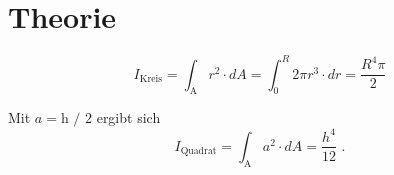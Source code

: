 \section{Theorie}
\label{sec:Theorie}


\begin{equation}\label{eq:FlTreagKreis}
        I_\text{Kreis} = \int_\text{A} r^2 \cdot dA = \int_0^R 2 \pi r^3 \cdot dr = \frac{R^4 \pi}{2}
\end{equation}

Mit $a = \text{h / 2}$ ergibt sich
\begin{equation}\label{eq:FlTreagQuadrat}
        I_\text{Quadrat} = \int_\text{A} a^2 \cdot dA = \frac{h^4} {12} \text{ .}
\end{equation}
